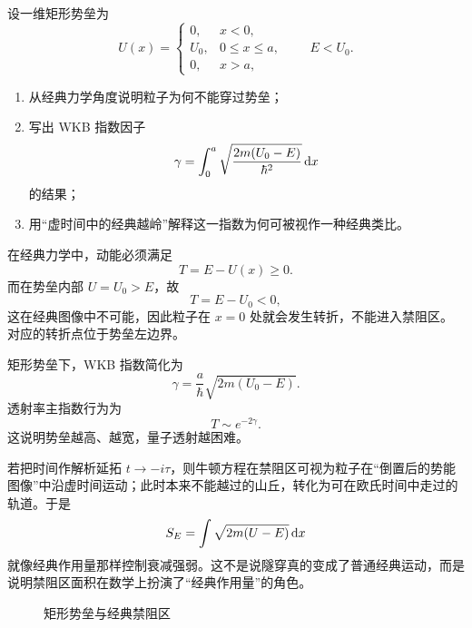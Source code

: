 \begin{problem}
设一维矩形势垒为
\[
U(x)=\begin{cases}
0, & x<0,\\
U_0, & 0\le x\le a,\\
0, & x>a,
\end{cases}
\qquad E<U_0.
\]
\begin{enumerate}
  \item 从经典力学角度说明粒子为何不能穿过势垒；
  \item 写出 WKB 指数因子
  \[
  \gamma=\int_0^a \sqrt{\frac{2m\qty(U_0-E)}{\hbar^2}}\,\dd x
  \]
  的结果；
  \item 用“虚时间中的经典越岭”解释这一指数为何可被视作一种经典类比。
\end{enumerate}
\begin{solution}
在经典力学中，动能必须满足
\[
T=E-U(x)\ge 0.
\]
而在势垒内部 $U=U_0>E$，故
\[
T=E-U_0<0,
\]
这在经典图像中不可能，因此粒子在 $x=0$ 处就会发生转折，不能进入禁阻区。对应的转折点位于势垒左边界。

矩形势垒下，WKB 指数简化为
\[
\gamma=\frac{a}{\hbar}\sqrt{2m(U_0-E)}.
\]
透射率主指数行为为
\[
T\sim e^{-2\gamma}.
\]
这说明势垒越高、越宽，量子透射越困难。

若把时间作解析延拓 $t\to -i\tau$，则牛顿方程在禁阻区可视为粒子在“倒置后的势能图像”中沿虚时间运动；此时本来不能越过的山丘，转化为可在欧氏时间中走过的轨道。于是
\[
S_E=\int \sqrt{2m\qty(U-E)}\,\dd x
\]
就像经典作用量那样控制衰减强弱。这不是说隧穿真的变成了普通经典运动，而是说明禁阻区面积在数学上扮演了“经典作用量”的角色。

\begin{figure}[H]
\centering
{}
\caption{矩形势垒与经典禁阻区}
\end{figure}
\end{solution}
\end{problem}
